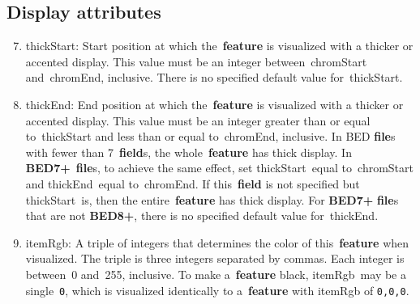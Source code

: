 \documentclass[11pt]{article}
\begin{document}
\subsection{Display attributes}
\begin{enumerate}
  \setcounter{enumi}{6}

\item \textsf{thickStart}: Start position at which the~\textbf{feature} is visualized with a thicker or accented display.
  This value must be an integer between~\textsf{chromStart} and~\textsf{chromEnd}, inclusive.
  There is no specified default value for~\textsf{thickStart}.

\item \textsf{thickEnd}: End position at which the~\textbf{feature} is visualized with a thicker or accented display.
  This value must be an integer greater than or equal to~\textsf{thickStart} and less than or equal to~\textsf{chromEnd}, inclusive.
  In \ac{BED} \textbf{file}s with fewer than 7~\textbf{field}s, the whole~\textbf{feature} has thick display.
  In \textbf{BED7+}~\textbf{file}s, to achieve the same effect, set \textsf{thickStart}~equal to~\textsf{chromStart} and \textsf{thickEnd}~equal to~\textsf{chromEnd}.
  If this~\textbf{field} is not specified but \textsf{thickStart}~is, then the entire~\textbf{feature} has thick display.
  For \textbf{BED7+} \textbf{file}s that are not \textbf{BED8+}, there is no specified default value for~\textsf{thickEnd}.

\item \textsf{itemRgb}: A triple of integers that determines the color of this~\textbf{feature} when visualized.
  The triple is three integers separated by commas.
  Each integer is between~0 and~255, inclusive.
  To make a~\textbf{feature} black, \textsf{itemRgb}~may be a single~\texttt{0}, which is visualized identically to a~\textbf{feature} with \textsf{itemRgb} of \texttt{0,0,0}.
\end{enumerate}
\end{document}
